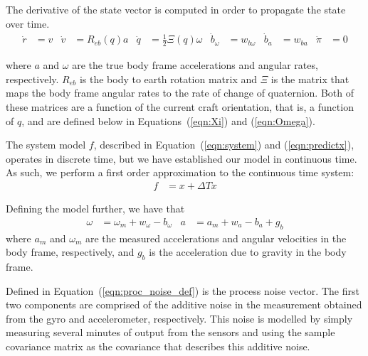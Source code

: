 \documentclass[]{article}
\begin{document}
{The derivative of the state vector is computed in order to propagate the state over time.
\begin{align}
	\label{eqn:xdotDef}
	\dot{r} &= v
	&
	\dot{v} &= R_{eb}(q) a
	&
	\dot{q} &= \frac{1}{2}\Xi(q) \omega
	&
	\dot{b}_\omega &= w_{b\omega}
	&
	\dot{b}_a &= w_{ba}
	&
	\dot{\pi} &= 0
\end{align}

where $a$ and $\omega$ are the true body frame accelerations and angular rates, respectively.
$R_{eb}$ is the body to earth rotation matrix and $\Xi$ is the matrix that maps the body frame angular rates to the rate of change of quaternion. Both of these matrices are a function of the current craft orientation, that is, a function of $q$, and are defined below in Equations~(\ref{eqn:Xi}) and (\ref{eqn:Omega}).

The system model $f$, described in Equation~(\ref{eqn:system}) and (\ref{eqn:predictx}), operates in discrete time, but we have established our model in continuous time. As such, we perform a first order approximation to the continuous time system:
\begin{align}
	f &= x + \Delta T \dot{x}
	\label{eqn:descrete_f}
\end{align}

Defining the model further, we have that
\begin{align}
	\omega &= \omega_m + w_\omega - b_\omega &
	a &= a_m + w_a - b_a + g_b
\end{align}
where $a_m$ and $\omega_m$ are the measured accelerations and angular velocities in the body frame, respectively, and $g_b$ is the acceleration due to gravity in the body frame.

Defined in Equation~(\ref{eqn:proc_noise_def}) is the process noise vector. The first two components are comprised of the additive noise in the measurement obtained from the gyro and accelerometer, respectively. This noise is modelled by simply measuring several minutes of output from the sensors and using the sample covariance matrix as the covariance that describes this additive noise.

}
\end{document}
